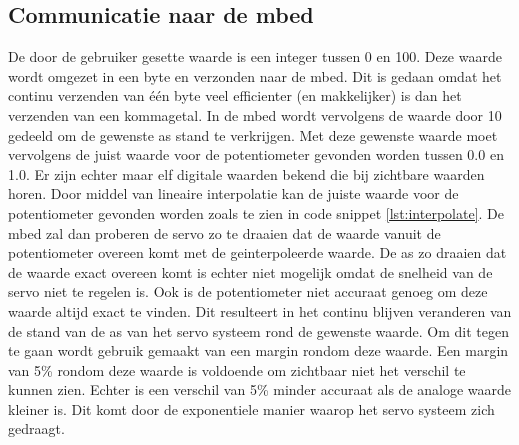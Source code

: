 \documentclass[a4paper]{article}
\begin{document}
		\subsection{Communicatie naar de mbed}
			De door de gebruiker gesette waarde is een integer tussen 0 en 100. Deze waarde wordt omgezet in een byte en verzonden naar de mbed. Dit is gedaan omdat het continu verzenden van \'e\'en byte veel efficienter (en makkelijker) is dan het verzenden van een kommagetal. In de mbed wordt vervolgens de waarde door 10 gedeeld om de gewenste as stand te verkrijgen. Met deze gewenste waarde moet vervolgens de juist waarde voor de potentiometer gevonden worden tussen 0.0 en 1.0. Er zijn echter maar elf digitale waarden bekend die bij zichtbare waarden horen. Door middel van lineaire interpolatie kan de juiste waarde voor de potentiometer gevonden worden zoals te zien in code snippet \ref{lst:interpolate}. De mbed zal dan proberen de servo zo te draaien dat de waarde vanuit de potentiometer overeen komt met de geinterpoleerde waarde. De as zo draaien dat de waarde exact overeen komt is echter niet mogelijk omdat de snelheid van de servo niet te regelen is. Ook is de potentiometer niet accuraat genoeg om deze waarde altijd exact te vinden. Dit resulteert in het continu blijven veranderen van de stand van de as van het servo systeem rond de gewenste waarde. Om dit tegen te gaan wordt gebruik gemaakt van een margin rondom deze waarde. Een margin van 5\% rondom deze waarde is voldoende om zichtbaar niet het verschil te kunnen zien. Echter is een verschil van 5\% minder accuraat als de analoge waarde kleiner is. Dit komt door de exponentiele manier waarop het servo systeem zich gedraagt.
\end{document}
